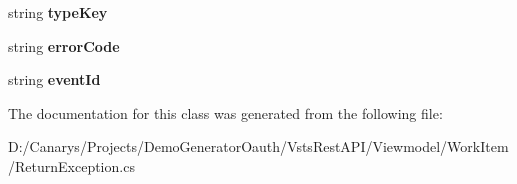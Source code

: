 \begin{DoxyCompactItemize}
string {\bfseries type\+Key}
\item 
\mbox{\label{class_vsts_rest_a_p_i_1_1_viewmodel_1_1_work_item_1_1_return_exception_a7139a7dd321ede09a260d9cb04280422}} 
string {\bfseries error\+Code}
\item 
\mbox{\label{class_vsts_rest_a_p_i_1_1_viewmodel_1_1_work_item_1_1_return_exception_a4184b4d921685c2c96e15a34d51bb6de}} 
string {\bfseries event\+Id}
\end{DoxyCompactItemize}


The documentation for this class was generated from the following file\+:\begin{DoxyCompactItemize}
\item 
D\+:/\+Canarys/\+Projects/\+Demo\+Generator\+Oauth/\+Vsts\+Rest\+A\+P\+I/\+Viewmodel/\+Work\+Item/Return\+Exception.\+cs\end{DoxyCompactItemize}
